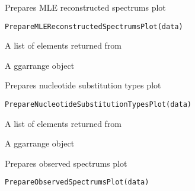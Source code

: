 \documentclass[letterpaper]{book}
\begin{document}
%
\begin{Description}\relax
Prepares MLE reconstructed spectrums plot
\end{Description}
%
\begin{Usage}
\begin{verbatim}
PrepareMLEReconstructedSpectrumsPlot(data)
\end{verbatim}
\end{Usage}
%
\begin{Arguments}
\begin{ldescription}
\item[\code{data}] A list of elements returned from 
\end{ldescription}
\end{Arguments}
%
\begin{Value}
A ggarrange object
\end{Value}
%
\begin{Description}\relax
Prepares nucleotide substitution types plot
\end{Description}
%
\begin{Usage}
\begin{verbatim}
PrepareNucleotideSubstitutionTypesPlot(data)
\end{verbatim}
\end{Usage}
%
\begin{Arguments}
\begin{ldescription}
\item[\code{data}] A list of elements returned from 
\end{ldescription}
\end{Arguments}
%
\begin{Value}
A ggarrange object
\end{Value}
%
\begin{Description}\relax
Prepares observed spectrums plot
\end{Description}
%
\begin{Usage}
\begin{verbatim}
PrepareObservedSpectrumsPlot(data)
\end{verbatim}
\end{Usage}
\end{document}
